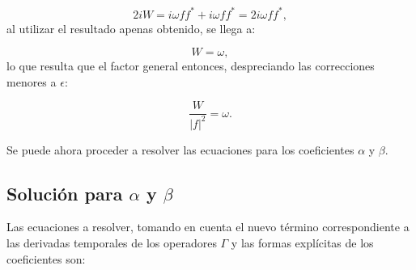 \documentclass[a4paper,10pt]{report}
\begin{document}
\begin{equation}
2iW = i\omega ff^* + i\omega ff^* = 2i\omega ff^*,
\end{equation} al utilizar el resultado apenas obtenido, se llega a:

\begin{equation}
W = \omega,
\end{equation} lo que resulta que el factor general entonces, despreciando las correcciones menores a $\epsilon$:

\begin{equation}
\frac{W}{|f|^2} = \omega.
\end{equation}

Se puede ahora proceder a resolver las ecuaciones para los coeficientes $\alpha$ y $\beta$.

\subsection{Solución para $\alpha$ y $\beta$}

Las ecuaciones a resolver, tomando en cuenta el nuevo término correspondiente a las derivadas temporales de los operadores $\Gamma$ y las formas explícitas de los coeficientes son:







\end{document}
